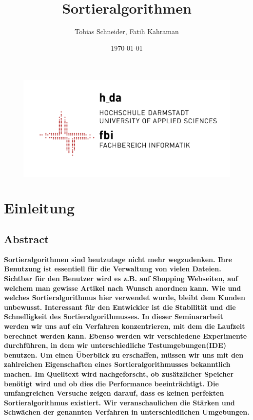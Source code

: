 \documentclass{article}
\title{Sortieralgorithmen}
\author{Tobias Schneider, Fatih Kahraman}
\date{\today}
\begin{document}
\begin{figure}
\includegraphics[scale = 1.5]{fbi_bild.png}
\end{figure}

\maketitle %
\thispagestyle{empty} %
\newpage{}

\tableofcontents{}%
\setcounter{page}{1} %
\newpage{}


\section{Einleitung}
\subsection{Abstract}
\textbf{Sortieralgorithmen sind heutzutage nicht mehr wegzudenken. Ihre Benutzung ist essentiell für die Verwaltung von vielen Dateien. Sichtbar für den Benutzer wird es z.B. auf Shopping Webseiten, auf welchem man gewisse Artikel nach Wunsch anordnen kann. Wie und welches Sortieralgorithmus hier verwendet wurde, bleibt dem Kunden unbewusst. Interessant für den Entwickler ist die Stabilität und die Schnelligkeit des Sortieralgorithmusses. 
In dieser Seminararbeit werden wir uns auf ein Verfahren konzentrieren, mit dem die Laufzeit berechnet werden kann. Ebenso werden wir verschiedene Experimente durchführen, in dem wir unterschiedliche Testumgebungen(IDE) benutzen.
Um einen Überblick zu erschaffen, müssen wir uns mit den zahlreichen Eigenschaften eines Sortieralgorithmusses bekanntlich machen. Im Quelltext wird nachgeforscht, ob zusätzlicher Speicher benötigt wird und ob dies die Performance beeinträchtigt.
Die umfangreichen Versuche zeigen darauf, dass es keinen perfekten Sortieralgorithmus existiert. Wir veranschaulichen die Stärken und Schwächen der genannten Verfahren in unterschiedlichen Umgebungen.}
\end{document}
